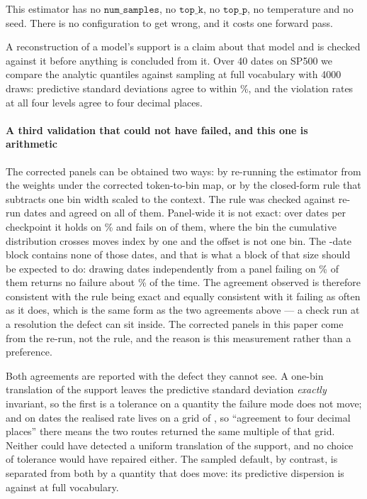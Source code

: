 \documentclass[preprint,11pt,authoryear]{elsarticle}
\newcommand{\1}{\boldsymbol{1}}
\begin{document}
This estimator has no $\texttt{num\_samples}$, no $\texttt{top\_k}$, no
$\texttt{top\_p}$, no temperature and no seed. There is no configuration to get
wrong, and it costs one forward pass.

A reconstruction of a model's support is a claim about that model and is checked
against it before anything is concluded from it. Over 40 dates on SP500 we
compare the analytic quantiles against sampling at full vocabulary with 4000
draws: predictive standard deviations agree to within \nLitAnalyticSdPct\%, and
the violation rates at all four levels agree to four decimal places.

\paragraph{A third validation that could not have failed, and this one is
arithmetic} The corrected panels can be obtained two ways: by re-running the
estimator from the weights under the corrected token-to-bin map, or by the
closed-form rule that subtracts one bin width scaled to the context. The rule
was checked against \nRuleValidationDates{} re-run dates and agreed on all of
them. Panel-wide it is not exact: over \nRuleRows{} dates per checkpoint it
holds on \nRuleExactPct\% and fails on \nRuleFailures{} of them, where the bin
the cumulative distribution crosses moves index by one and the offset is not one
bin. The \nRuleValidationDates{}-date block contains none of those
\nRuleFailures{} dates, and that is what a block of that size should be expected
to do: drawing \nRuleValidationDates{} dates independently from a panel failing
on \nRuleFailPct\% of them returns no failure about \nRuleMissProb\% of the
time. The agreement observed is therefore consistent with the rule being exact
and equally consistent with it failing as often as it does, which is the same
form as the two agreements above --- a check run at a resolution the defect can
sit inside. The corrected panels in this paper come from the re-run, not the
rule, and the reason is this measurement rather than a preference.

Both agreements are reported with the defect they cannot see. A one-bin
translation of the support leaves the predictive standard deviation
\emph{exactly} invariant, so the first is a tolerance on a quantity the failure
mode does not move; and on \nLitAnalyticDates{} dates the realised rate lives on
a grid of \nLitAnalyticGrid{}, so ``agreement to four decimal places'' there
means the two routes returned the same multiple of that grid. Neither could have
detected a uniform translation of the support, and no choice of tolerance would
have repaired either. The sampled default, by contrast, is separated from
both by a quantity that does move: its predictive dispersion is
\nDispDefaultSmall{} against \nDispFullSmall{} at full vocabulary.
\end{document}
